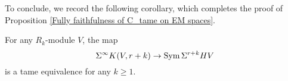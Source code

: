To conclude, we record the following corollary, which completes the proof of Proposition \ref{Fully faithfulness of C_tame on EM spaces}.
\begin{corollary}
	For any $R_k$-module $V$, the map 
	$$\Sigma^{\infty}K(V,r+k) \to 
	\operatorname{Sym} \Sigma^{r+k}HV$$ is a tame equivalence for any $k\geq 1$.
\end{corollary}







%
%










